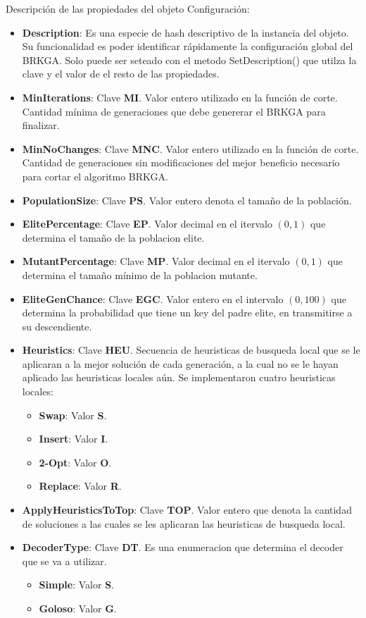\bigskip

\begin{minipage}{\textwidth}
Descripción de las propiedades del objeto Configuración:

\begin{itemize}
  \item \textbf{Description}: Es una especie de hash descriptivo de la instancia del objeto. Su funcionalidad es poder identificar rápidamente la configuración global del BRKGA. Solo puede ser seteado con el metodo SetDescription() que utilza la clave y el valor de el resto de las propiedades.
  \item \textbf{MinIterations}: Clave \textbf{MI}. Valor entero utilizado en la función de corte. Cantidad mínima de generaciones que debe genererar el BRKGA para finalizar. 
  \item \textbf{MinNoChanges}: Clave \textbf{MNC}. Valor entero utilizado en la función de corte. Cantidad de generaciones sin modificaciones del mejor beneficio necesario para cortar el algoritmo BRKGA.
  \item \textbf{PopulationSize}: Clave \textbf{PS}. Valor entero denota el tamaño de la población.
  \item \textbf{ElitePercentage}: Clave \textbf{EP}. Valor decimal en el itervalo $(0, 1)$ que determina el tamaño de la poblacion elite. 
  \item \textbf{MutantPercentage}: Clave \textbf{MP}. Valor decimal en el itervalo $(0, 1)$ que determina el tamaño mínimo de la poblacion mutante. 
  \item \textbf{EliteGenChance}: Clave \textbf{EGC}. Valor entero en el intervalo $(0, 100)$ que determina la probabilidad que tiene un key del padre elite, en transmitirse a su descendiente. 
  \item \textbf{Heuristics}: Clave \textbf{HEU}. Secuencia de heuristicas de busqueda local que se le aplicaran a la mejor solución de cada generación, a la cual no se le hayan aplicado las heuristicas locales aún. Se implementaron cuatro heuristicas locales:
	\begin{itemize}
		\item \textbf{Swap}: Valor \textbf{S}.
		\item \textbf{Insert}: Valor \textbf{I}.
		\item \textbf{2-Opt}: Valor \textbf{O}.
		\item \textbf{Replace}: Valor \textbf{R}.
	\end{itemize}  
  \item \textbf{ApplyHeuristicsToTop}: Clave \textbf{TOP}. Valor entero que denota la cantidad de soluciones a las cuales se les aplicaran las heuristicas de busqueda local.
  \item \textbf{DecoderType}: Clave \textbf{DT}. Es una enumeracion que determina el decoder que se va a utilizar.
	\begin{itemize}
		\item \textbf{Simple}: Valor \textbf{S}.
		\item \textbf{Goloso}: Valor \textbf{G}.
	\end{itemize}  
\end{itemize}
\end{minipage}

